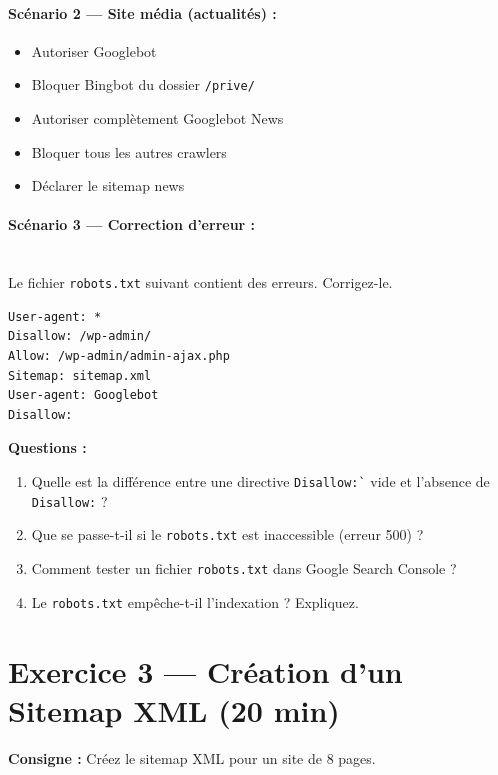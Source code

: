 \documentclass[12pt,a4paper]{report}
\begin{document}
\paragraph{Sc\'{e}nario 2 --- Site m\'{e}dia (actualit\'{e}s) :}
\begin{itemize}
    \item Autoriser Googlebot
    \item Bloquer Bingbot du dossier \texttt{/prive/}
    \item Autoriser compl\`{e}tement Googlebot News
    \item Bloquer tous les autres crawlers
    \item D\'{e}clarer le sitemap news
\end{itemize}

\paragraph{Sc\'{e}nario 3 --- Correction d'erreur :}\\
Le fichier \texttt{robots.txt} suivant contient des erreurs. Corrigez-le.

\begin{lstlisting}
User-agent: *
Disallow: /wp-admin/
Allow: /wp-admin/admin-ajax.php
Sitemap: sitemap.xml
User-agent: Googlebot
Disallow:
\end{lstlisting}

\textbf{Questions :}
\begin{enumerate}
    \item Quelle est la diff\'{e}rence entre une directive \texttt{Disallow:\`{}} vide et l'absence de \texttt{Disallow:} ?
    \item Que se passe-t-il si le \texttt{robots.txt} est inaccessible (erreur 500) ?
    \item Comment tester un fichier \texttt{robots.txt} dans Google Search Console ?
    \item Le \texttt{robots.txt} emp\^{e}che-t-il l'indexation ? Expliquez.
\end{enumerate}

\section{Exercice 3 --- Cr\'{e}ation d'un Sitemap XML (20 min)}

\textbf{Consigne :} Cr\'{e}ez le sitemap XML pour un site de 8 pages.
\end{document}
